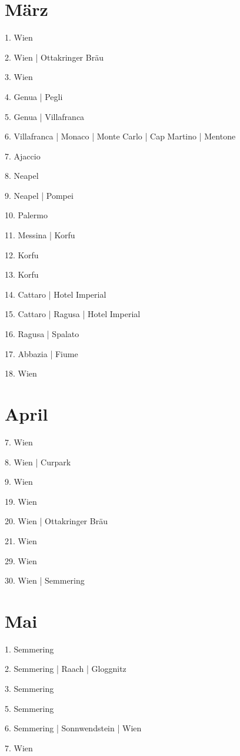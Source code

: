 \documentclass[twoside=false,titlepage=false,open=any, parskip=never, fontsize=10pt, headings=small, chapterprefix=false, appendixprefix=false, DIV=15]{scrbook}
\begin{document}
\begin{multicols}{3}
            \section*{März}
            1. Wien\par
            2. Wien | Ottakringer Bräu\par
            3. Wien\par
            4. Genua | Pegli\par
            5. Genua | Villafranca\par
            6. Villafranca | Monaco | Monte Carlo | Cap Martino | Mentone\par
            7. Ajaccio\par
            8. Neapel\par
            9. Neapel | Pompei\par
            10. Palermo\par
            11. Messina | Korfu\par
            12. Korfu\par
            13. Korfu\par
            14. Cattaro | Hotel Imperial\par
            15. Cattaro | Ragusa | Hotel Imperial\par
            16. Ragusa | Spalato\par
            17. Abbazia | Fiume\par
            18. Wien\par
            \section*{April}
            7. Wien\par
            8. Wien | Curpark\par
            9. Wien\par
            19. Wien\par
            20. Wien | Ottakringer Bräu\par
            21. Wien\par
            29. Wien\par
            30. Wien | Semmering\par
            \section*{Mai}
            1. Semmering\par
            2. Semmering | Raach | Gloggnitz\par
            3. Semmering\par
            5. Semmering\par
            6. Semmering | Sonnwendstein | Wien\par
            7. Wien\par

\end{multicols}
\end{document}

